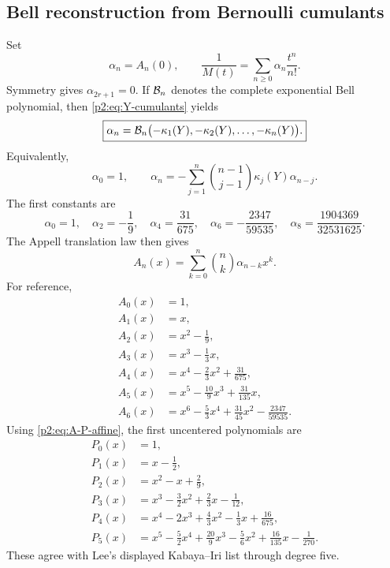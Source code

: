 \documentclass[11pt,oneside]{article}
\numberwithin{equation}{section}
\theoremstyle{definition}
\theoremstyle{remark}
\begin{document}
\subsection{Bell reconstruction from Bernoulli cumulants}

Set
\begin{equation}
 \alpha_n=A_n(0),
 \qquad
 \frac1{M(t)}=\sum_{n\ge0}\alpha_n\frac{t^n}{n!}.
 \label{p2:eq:alpha-def}
\end{equation}
Symmetry gives $\alpha_{2r+1}=0$.  If $\mathcal B_n$ denotes the complete exponential Bell polynomial,
then \eqref{p2:eq:Y-cumulants} yields
\begin{equation}
 \boxed{
 \alpha_n=\mathcal B_n\bigl(-\kappa_1(Y),-\kappa_2(Y),\ldots,-\kappa_n(Y)\bigr).
 }
 \label{p2:eq:alpha-Bell}
\end{equation}
Equivalently,
\begin{equation}
 \alpha_0=1,
 \qquad
 \alpha_n=-\sum_{j=1}^n\binom{n-1}{j-1}\kappa_j(Y)\alpha_{n-j}.
 \label{p2:eq:alpha-recurrence}
\end{equation}
The first constants are
\begin{equation}
 \alpha_0=1,
 \quad \alpha_2=-\frac19,
 \quad \alpha_4=\frac{31}{675},
 \quad \alpha_6=-\frac{2347}{59535},
 \quad \alpha_8=\frac{1904369}{32531625}.
 \label{p2:eq:alpha-first}
\end{equation}
The Appell translation law then gives
\begin{equation}
 A_n(x)=\sum_{k=0}^n\binom nk\alpha_{n-k}x^k.
 \label{p2:eq:A-from-alpha}
\end{equation}
For reference,
\begin{equation}
\begin{aligned}
 A_0(x)&=1,\\
 A_1(x)&=x,\\
 A_2(x)&=x^2-\frac19,\\
 A_3(x)&=x^3-\frac13x,\\
 A_4(x)&=x^4-\frac23x^2+\frac{31}{675},\\
 A_5(x)&=x^5-\frac{10}{9}x^3+\frac{31}{135}x,\\
 A_6(x)&=x^6-\frac53x^4+\frac{31}{45}x^2-\frac{2347}{59535}.
\end{aligned}
\label{p2:eq:A-first-polys}
\end{equation}
Using \eqref{p2:eq:A-P-affine}, the first uncentered polynomials are
\begin{equation}
\begin{aligned}
 P_0(x)&=1,\\
 P_1(x)&=x-\frac12,\\
 P_2(x)&=x^2-x+\frac29,\\
 P_3(x)&=x^3-\frac32x^2+\frac23x-\frac1{12},\\
 P_4(x)&=x^4-2x^3+\frac43x^2-\frac13x+\frac{16}{675},\\
 P_5(x)&=x^5-\frac52x^4+\frac{20}{9}x^3-\frac56x^2+\frac{16}{135}x-\frac1{270}.
\end{aligned}
\label{p2:eq:P-first-polys}
\end{equation}
These agree with Lee's displayed Kabaya--Iri list through degree five.
\end{document}
